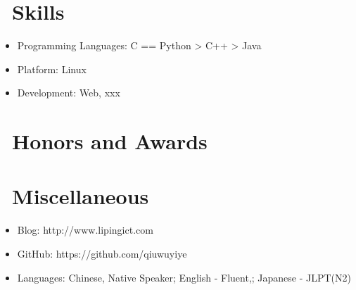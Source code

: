 \documentclass{resume}
\begin{document}

\section{\faCogs\ Skills}
\begin{itemize}[parsep=0.5ex]
  \item Programming Languages: C == Python > C++ > Java
  \item Platform: Linux
  \item Development: Web, xxx
\end{itemize}

\section{\faHeartO\ Honors and Awards}

\section{\faInfo\ Miscellaneous}
\begin{itemize}[parsep=0.5ex]
  \item Blog: http://www.lipingict.com
  \item GitHub: https://github.com/qiuwuyiye
  \item Languages: Chinese, Native Speaker; English - Fluent,; Japanese - JLPT(N2)
\end{itemize}

%
%
\end{document}
